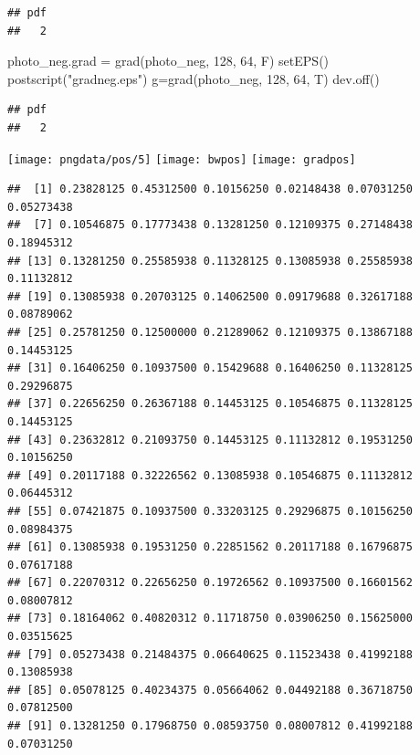 \documentclass[
]{article}
\newenvironment{Shaded}{\begin{snugshade}}{\end{snugshade}}
\newcommand{\DecValTok}[1]{\textcolor[rgb]{0.00,0.00,0.81}{#1}}
\newcommand{\FunctionTok}[1]{\textcolor[rgb]{0.00,0.00,0.00}{#1}}
\newcommand{\NormalTok}[1]{#1}
\newcommand{\OtherTok}[1]{\textcolor[rgb]{0.56,0.35,0.01}{#1}}
\newcommand{\SpecialCharTok}[1]{\textcolor[rgb]{0.00,0.00,0.00}{#1}}
\newcommand{\StringTok}[1]{\textcolor[rgb]{0.31,0.60,0.02}{#1}}
\begin{document}
\begin{verbatim}
## pdf 
##   2
\end{verbatim}

\begin{Shaded}
\begin{Highlighting}[]
\NormalTok{photo\_neg.grad }\OtherTok{=} \FunctionTok{grad}\NormalTok{(photo\_neg, }\DecValTok{128}\NormalTok{, }\DecValTok{64}\NormalTok{, F)}
\FunctionTok{setEPS}\NormalTok{()}
\FunctionTok{postscript}\NormalTok{(}\StringTok{"gradneg.eps"}\NormalTok{)}
\NormalTok{g}\OtherTok{=}\FunctionTok{grad}\NormalTok{(photo\_neg, }\DecValTok{128}\NormalTok{, }\DecValTok{64}\NormalTok{, T)}
\FunctionTok{dev.off}\NormalTok{()}
\end{Highlighting}
\end{Shaded}

\begin{verbatim}
## pdf 
##   2
\end{verbatim}

\begin{Shaded}
\end{Shaded}

\texttt{[image: pngdata/pos/5]}
\texttt{[image: bwpos]}
\texttt{[image: gradpos]}

\begin{verbatim}
##  [1] 0.23828125 0.45312500 0.10156250 0.02148438 0.07031250 0.05273438
##  [7] 0.10546875 0.17773438 0.13281250 0.12109375 0.27148438 0.18945312
## [13] 0.13281250 0.25585938 0.11328125 0.13085938 0.25585938 0.11132812
## [19] 0.13085938 0.20703125 0.14062500 0.09179688 0.32617188 0.08789062
## [25] 0.25781250 0.12500000 0.21289062 0.12109375 0.13867188 0.14453125
## [31] 0.16406250 0.10937500 0.15429688 0.16406250 0.11328125 0.29296875
## [37] 0.22656250 0.26367188 0.14453125 0.10546875 0.11328125 0.14453125
## [43] 0.23632812 0.21093750 0.14453125 0.11132812 0.19531250 0.10156250
## [49] 0.20117188 0.32226562 0.13085938 0.10546875 0.11132812 0.06445312
## [55] 0.07421875 0.10937500 0.33203125 0.29296875 0.10156250 0.08984375
## [61] 0.13085938 0.19531250 0.22851562 0.20117188 0.16796875 0.07617188
## [67] 0.22070312 0.22656250 0.19726562 0.10937500 0.16601562 0.08007812
## [73] 0.18164062 0.40820312 0.11718750 0.03906250 0.15625000 0.03515625
## [79] 0.05273438 0.21484375 0.06640625 0.11523438 0.41992188 0.13085938
## [85] 0.05078125 0.40234375 0.05664062 0.04492188 0.36718750 0.07812500
## [91] 0.13281250 0.17968750 0.08593750 0.08007812 0.41992188 0.07031250
\end{verbatim}
\end{document}
